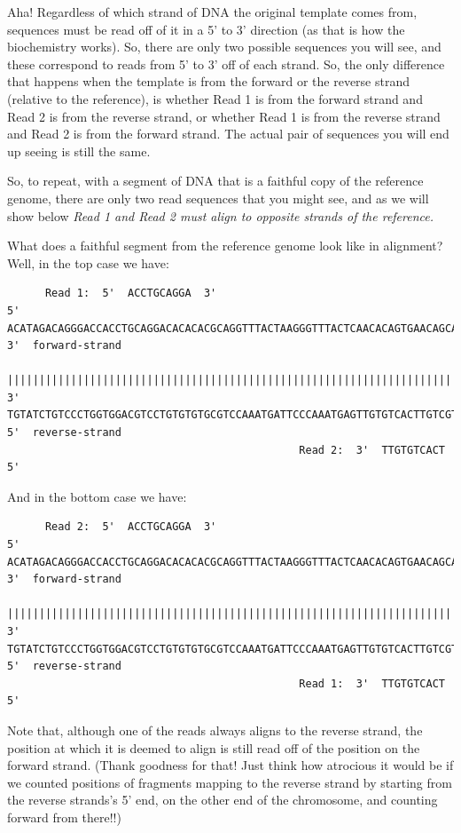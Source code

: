 \documentclass[]{krantz}
\begin{document}
Aha! Regardless of which strand of DNA the original template
comes from, sequences must be read off of it in a 5' to 3' direction
(as that is how the biochemistry works). So, there are only two
possible sequences you will see, and these correspond to reads from 5' to 3'
off of each strand. So, the only difference that happens when
the template is from the forward or the reverse strand (relative to the
reference), is whether Read 1 is from the forward strand and Read 2 is
from the reverse strand, or whether Read 1 is from the reverse strand
and Read 2 is from the forward strand. The actual pair of sequences
you will end up seeing is still the same.

So, to repeat, with a segment of DNA that is a faithful copy of the reference genome,
there are only two read sequences that you might see, and as we will show
below \emph{Read 1 and Read 2 must
align to opposite strands of the reference.}

What does a faithful segment from the reference genome look like
in alignment? Well, in the top case we have:

\begin{verbatim}
      Read 1:  5'  ACCTGCAGGA  3' 
5'  ACATAGACAGGGACCACCTGCAGGACACACACGCAGGTTTACTAAGGGTTTACTCAACACAGTGAACAGCATATACCAGA  3'  forward-strand
    ||||||||||||||||||||||||||||||||||||||||||||||||||||||||||||||||||||||||||||||||
3'  TGTATCTGTCCCTGGTGGACGTCCTGTGTGTGCGTCCAAATGATTCCCAAATGAGTTGTGTCACTTGTCGTATATGGTCT  5'  reverse-strand
                                              Read 2:  3'  TTGTGTCACT  5'
\end{verbatim}

And in the bottom case we have:

\begin{verbatim}
      Read 2:  5'  ACCTGCAGGA  3' 
5'  ACATAGACAGGGACCACCTGCAGGACACACACGCAGGTTTACTAAGGGTTTACTCAACACAGTGAACAGCATATACCAGA  3'  forward-strand
    ||||||||||||||||||||||||||||||||||||||||||||||||||||||||||||||||||||||||||||||||
3'  TGTATCTGTCCCTGGTGGACGTCCTGTGTGTGCGTCCAAATGATTCCCAAATGAGTTGTGTCACTTGTCGTATATGGTCT  5'  reverse-strand
                                              Read 1:  3'  TTGTGTCACT  5'
\end{verbatim}

Note that, although one of the reads always aligns to the reverse strand, the position
at which it is deemed to align is still read off of the position on the forward strand.
(Thank goodness for that! Just
think how atrocious it would be if we counted positions of fragments mapping to the reverse strand
by starting from the reverse strands's 5' end, on the other end of the chromosome, and counting
forward from there!!)
\end{document}

